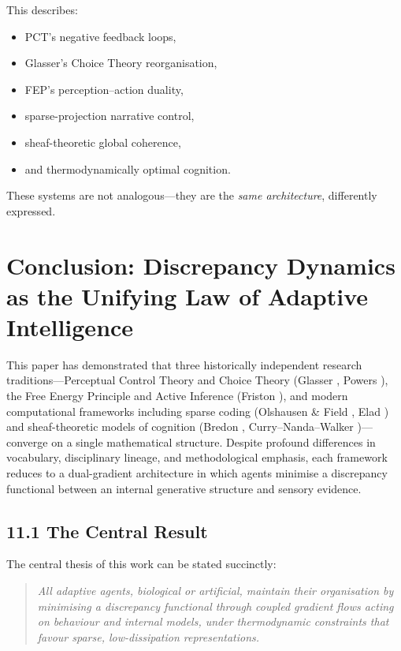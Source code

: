\documentclass[11pt,a4paper,twoside]{article}
\begin{document}
This describes:
\begin{itemize}
\item PCT’s negative feedback loops,
\item Glasser’s Choice Theory reorganisation,
\item FEP’s perception--action duality,
\item sparse-projection narrative control,
\item sheaf-theoretic global coherence,
\item and thermodynamically optimal cognition.
\end{itemize}

These systems are not analogous---they are the \emph{same architecture}, differently expressed.

\section{Conclusion: Discrepancy Dynamics as the Unifying Law of Adaptive Intelligence}\label{sec:conclusion}

This paper has demonstrated that three historically independent research traditions---Perceptual Control Theory and Choice Theory (Glasser \cite{glasser1998choice,glasser1981stations}, Powers \cite{powers1973behavior,powers2005behavior}), the Free Energy Principle and Active Inference (Friston \cite{friston2009free,friston2010free}), and modern computational frameworks including sparse coding (Olshausen & Field \cite{olshausen1996emergence}, Elad \cite{elad2010sparse}) and sheaf-theoretic models of cognition (Bredon \cite{bredon1997sheaf}, Curry--Nanda--Walker \cite{curry2021sheafcomp})---converge on a single mathematical structure. Despite profound differences in vocabulary, disciplinary lineage, and methodological emphasis, each framework reduces to a dual-gradient architecture in which agents minimise a discrepancy functional between an internal generative structure and sensory evidence.

\subsection*{11.1 The Central Result}

The central thesis of this work can be stated succinctly:

\begin{quote}
\emph{All adaptive agents, biological or artificial, maintain their organisation by minimising a discrepancy functional through coupled gradient flows acting on behaviour and internal models, under thermodynamic constraints that favour sparse, low-dissipation representations.}
\end{quote}
\end{document}
